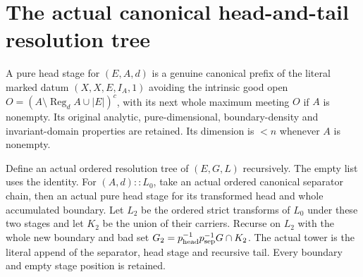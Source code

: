 \section{The actual canonical head-and-tail resolution tree}

\begin{definition}
\label{hir:original-canonical-ordered-resolution-tree}
\leanok
A pure head stage for $(E,A,d)$ is a genuine canonical prefix of the
literal marked datum $(X,X,E,I_A,1)$ avoiding the intrinsic good open
$O=(A\setminus\operatorname{Reg}_d A\cup|E|)^c$, with its next whole
maximum meeting $O$ if $A$ is nonempty. Its original analytic,
pure-dimensional, boundary-density and invariant-domain properties are
retained. Its dimension is $<n$ whenever $A$ is nonempty.

Define an actual ordered resolution tree of $(E,G,L)$ recursively.
The empty list uses the identity. For $(A,d)::L_0$, take an actual
ordered canonical separator chain, then an actual pure head stage
for its transformed head and whole accumulated boundary. Let $L_2$
be the ordered strict transforms of $L_0$ under these two stages and
let $K_2$ be the union of their carriers. Recurse on $L_2$ with the
whole new boundary and bad set
$G_2=p_{\rm head}^{-1}p_{\rm sep}^{-1}G\cap K_2$. The actual tower
is the literal append of the separator, head stage and recursive tail.
Every boundary and empty stage position is retained.
\end{definition}

